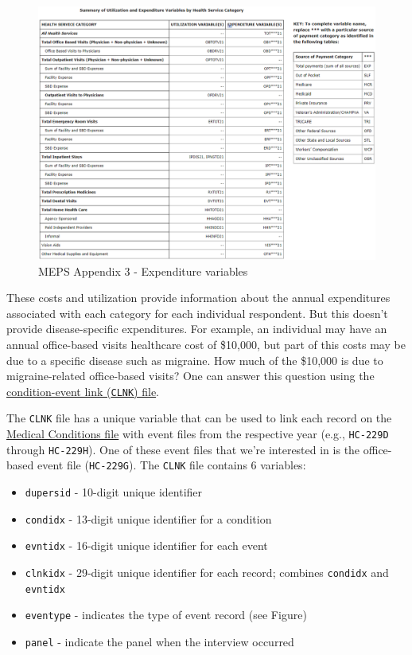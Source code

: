 \documentclass[
]{book}
\begin{document}
\begin{figure}
\includegraphics[width=1\linewidth]{Figure 4_1 - Appendix 3} \caption{MEPS Appendix 3 - Expenditure variables}\label{fig:unnamed-chunk-34}
\end{figure}

These costs and utilization provide information about the annual expenditures associated with each category for each individual respondent. But this doesn't provide disease-specific expenditures. For example, an individual may have an annual office-based visits healthcare cost of \$10,000, but part of this costs may be due to a specific disease such as migraine. How much of the \$10,000 is due to migraine-related office-based visits? One can answer this question using the \href{https://meps.ahrq.gov/data_stats/download_data/pufs/h229i/h229idoc.shtml}{condition-event link (\texttt{CLNK}) file}.

The \texttt{CLNK} file has a unique variable that can be used to link each record on the \href{https://meps.ahrq.gov/data_stats/download_data_files_detail.jsp?cboPufNumber=HC-231}{Medical Conditions file} with event files from the respective year (e.g., \texttt{HC-229D} through \texttt{HC-229H}). One of these event files that we're interested in is the office-based event file (\texttt{HC-229G}). The \texttt{CLNK} file contains 6 variables:

\begin{itemize}
\item
  \texttt{dupersid} - 10-digit unique identifier
\item
  \texttt{condidx} - 13-digit unique identifier for a condition
\item
  \texttt{evntidx} - 16-digit unique identifier for each event
\item
  \texttt{clnkidx} - 29-digit unique identifier for each record; combines \texttt{condidx} and \texttt{evntidx}
\item
  \texttt{eventype} - indicates the type of event record (see Figure)
\item
  \texttt{panel} - indicate the panel when the interview occurred
\end{itemize}
\end{document}
